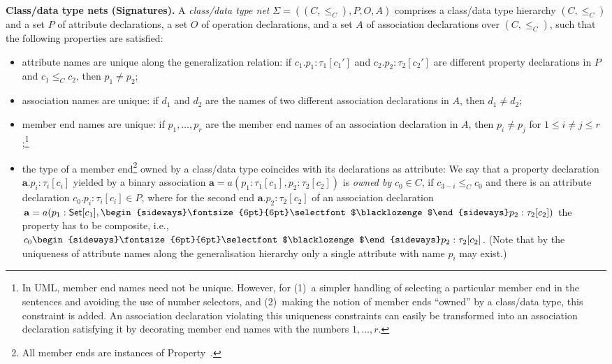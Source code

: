 \documentclass[10pt, a4paper]{isov2}
\newcommand{\uml}[1]{\textsf{#1}}
\newcommand{\composition}{\raisebox{0.2pt}{\begin{sideways}\fontsize{6pt}{6pt}\selectfont$\blacklozenge$\end{sideways}}}
\begin{document}
\medskip\noindent\textbf{Class/data type nets (Signatures).}
A \emph{class/data type net} $\Sigma = ((C, {\leq_C}), P, O, A)$
comprises a class/data type hierarchy $(C, {\leq_C})$ and a set $P$ of
attribute declarations, a set $O$ of operation declarations,
 and a set $A$ of association declarations over
$(C, {\leq_C})$, such that
the following properties are satisfied:
%
 \begin{itemize} [label={--}, leftmargin=*]
  \item attribute names are unique along the generalization relation: if
$c_1.p_1 : \tau_1[c_1']$ and $c_2.p_2 : \tau_2[c_2']$ are different
property declarations in $P$ and $c_1 \leq_C c_2$, then $p_1 \neq
p_2$;

  \item association names are unique: if $d_1$
and $d_2$
are the names of two different association declarations in $A$,
then $d_1 \neq d_2$;

  \item member end names are unique: if $p_1, \ldots, p_r$
are the member end names of an association declaration in $A$,
then $p_i \neq p_j$
for $1 \leq i \neq j \leq r$;\footnote{In
  UML, member end names need not be unique.  However, for (1)~a simpler
  handling of selecting a particular member end in the sentences and
  avoiding the use of number selectors, and (2)~making the notion of
  member ends ``owned'' by a class/data type, this constraint is
  added. An association declaration violating this uniqueness
  constraints can easily be transformed into an association declaration
  satisfying it by decorating member end names with the numbers
  $1, \ldots, r$.}

  \item the type of a member end\footnote{All member ends are instances
  of \uml{Property}~\cite[p.~206]{uml-2.5}.}  owned by a class/data type
coincides with its declarations as attribute: We say that a property
declaration $\mathbf{a}.p_i : \tau_i[c_i]$
yielded by a binary association
$\mathbf{a} = a(p_1 : \tau_1[c_1], p_2 : \tau_2[c_2])$
is \emph{owned by} $c_0 \in C$,
if $c_{3-i} \leq_C c_0$
and there is an attribute declaration $c_0.p_i : \tau_i[c_i] \in P$,
where for the second end $\mathbf{a}.p_2 : \tau_2[c_2]$
of an association declaration
$\mathbf{a} = a(p_1 : \mathsf{Set}[c_1], \composition p_2 :
\tau_2[c_2])$ the property has to be composite, i.e.,
$c_0\composition p_2 : \tau_2[c_2]$.
(Note that by the uniqueness of attribute names along the generalisation
hierarchy only a single attribute with name $p_i$ may exist.)
 \end{itemize} 
\end{document}
